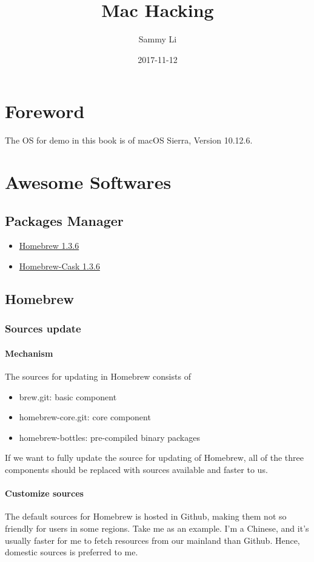 \documentclass[a4paper,10pt]{report}
\title{Mac Hacking}
\author{Sammy Li}
\date{2017-11-12}
\begin{document}
\maketitle

\tableofcontents

\chapter{Foreword}
The OS for demo in this book is of macOS Sierra, Version 10.12.6.

\chapter{Awesome Softwares}
\section{Packages Manager}
\begin{itemize}
  \item \href{https://brew.sh}{Homebrew 1.3.6}
  \item \href{http://caskroom.github.io}{Homebrew-Cask 1.3.6}
\end{itemize}

\section{Homebrew}
\subsection{Sources update}
\subsubsection{Mechanism}
The sources for updating in Homebrew consists of
\begin{itemize}
  \item brew.git: basic component
  \item homebrew-core.git: core component
  \item homebrew-bottles: pre-compiled binary packages
\end{itemize}
If we want to fully update the source for updating of Homebrew, all of the three components should be replaced with sources available and faster to us.
\subsubsection{Customize sources}
The default sources for Homebrew is hosted in Github, making them not so friendly for users in some regions. Take me as an example. I'm a Chinese, and it's  usually faster for me to fetch resources from our mainland than Github. Hence, domestic sources is preferred to me. 
\end{document}
